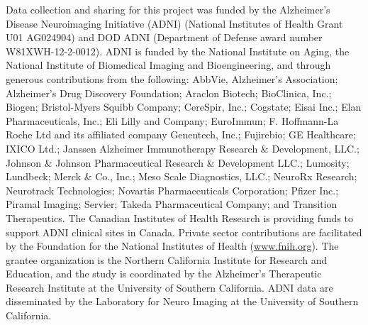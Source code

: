 \documentclass[10pt,journal,compsoc]{IEEEtran}
\begin{document}
Data collection and sharing for this project was funded by the Alzheimer's Disease Neuroimaging Initiative (ADNI) (National Institutes of Health Grant U01 AG024904) and DOD ADNI (Department of Defense award number W81XWH-12-2-0012). ADNI is funded by the National Institute on Aging, the National Institute of Biomedical Imaging and Bioengineering, and through generous contributions from the following: AbbVie, Alzheimer's Association; Alzheimer's Drug Discovery Foundation; Araclon Biotech; BioClinica, Inc.; Biogen; Bristol-Myers Squibb Company; CereSpir, Inc.; Cogstate; Eisai Inc.; Elan Pharmaceuticals, Inc.; Eli Lilly and Company; EuroImmun; F. Hoffmann-La Roche Ltd and its affiliated company Genentech, Inc.; Fujirebio; GE Healthcare; IXICO Ltd.; Janssen Alzheimer Immunotherapy Research \& Development, LLC.; Johnson \& Johnson Pharmaceutical Research \& Development LLC.; Lumosity; Lundbeck; Merck \& Co., Inc.; Meso Scale Diagnostics, LLC.; NeuroRx Research; Neurotrack Technologies; Novartis Pharmaceuticals Corporation; Pfizer Inc.; Piramal Imaging; Servier; Takeda Pharmaceutical Company; and Transition Therapeutics. The Canadian Institutes of Health Research is providing funds to support ADNI clinical sites in Canada. Private sector contributions are facilitated by the Foundation for the National Institutes of Health (\url{www.fnih.org}). The grantee organization is the Northern California Institute for Research and Education, and the study is coordinated by the Alzheimer's Therapeutic Research Institute at the University of Southern California. ADNI data are disseminated by the Laboratory for Neuro Imaging at the University of Southern California.


\ifCLASSOPTIONcaptionsoff
  \newpage
\fi







%
\end{document}
